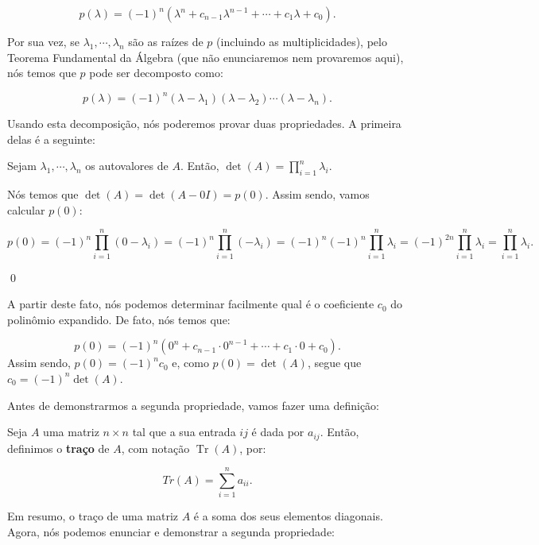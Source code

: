 $$
p(\lambda) = (-1)^n (\lambda^n + c_{n - 1}\lambda^{n - 1} + \cdots + c_1\lambda + c_0).
$$

Por sua vez, se $\lambda_1, \cdots, \lambda_n$ são as raízes de $p$ (incluindo as multiplicidades), pelo Teorema Fundamental da Álgebra (que não enunciaremos nem provaremos aqui), nós temos que $p$ pode ser decomposto como:

$$
p(\lambda) = (-1)^n(\lambda - \lambda_1)(\lambda - \lambda_2)\cdots(\lambda - \lambda_n).
$$

Usando esta decomposição, nós poderemos provar duas propriedades. A primeira delas é a seguinte:

\begin{Proposition}
	Sejam $\lambda_1, \cdots, \lambda_n$ os autovalores de $A$. Então, $\det(A) = \prod\limits_{i = 1}^{n} \lambda_i$.
\end{Proposition}

\begin{Proof}
	Nós temos que $\det(A) = \det(A - 0I) = p(0)$. Assim sendo, vamos calcular $p(0)$:
	
	$$
	p(0) = (-1)^n\prod\limits_{i = 1}^{n} (0 - \lambda_i) = (-1)^n\prod\limits_{i = 1}^{n} (-\lambda_i) = (-1)^n(-1)^n\prod\limits_{i = 1}^{n} \lambda_i = (-1)^{2n}\prod\limits_{i = 1}^{n} \lambda_i = \prod\limits_{i = 1}^{n} \lambda_i.
	$$
	
	\qed
\end{Proof}

A partir deste fato, nós podemos determinar facilmente qual é o coeficiente $c_0$ do polinômio expandido. De fato, nós temos que:

$$
p(0) = (-1)^n(0^{n} + c_{n - 1}\cdot0^{n - 1} + \cdots + c_1\cdot 0 + c_0).
$$
Assim sendo, $p(0) = (-1)^n c_0$ e, como $p(0) = \det(A)$, segue que $c_0 = (-1)^n\det(A)$.

Antes de demonstrarmos a segunda propriedade, vamos fazer uma definição:

\begin{Definition}
	Seja $A$ uma matriz $n\times n$ tal que a sua entrada $ij$ é dada por $a_{ij}$. Então, definimos o \textbf{traço} de $A$, com notação $\operatorname{Tr}(A)$, por:
	
	$$
	Tr(A) = \sum\limits_{i = 1}^{n} a_{ii}.
	$$
\end{Definition}

Em resumo, o traço de uma matriz $A$ é a soma dos seus elementos diagonais. Agora, nós podemos enunciar e demonstrar a segunda propriedade:

